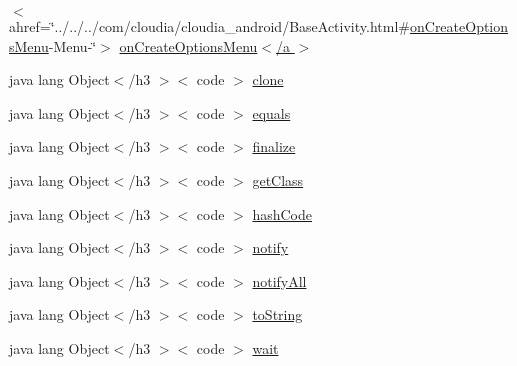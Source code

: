 \begin{DoxyCompactItemize}
$<$ ahref=\char`\"{}../../../com/cloudia/cloudia\-\_\-android/Base\-Activity.\-html\#\hyperlink{index-13_8html_a96b77eefe935dd33e8be2f1a26fcd2b6}{on\-Create\-Options\-Menu}-\/Menu-\/\char`\"{}$>$ \hyperlink{_splash_activity_8html_a624d351f7879c37d4dbd43acf019df6c}{on\-Create\-Options\-Menu$<$/a $>$}
\item 
java lang Object$<$/h3 $>$$<$ code $>$ \hyperlink{_splash_activity_8html_adc9607fcabf6f2d7f401ad52015ef6e0}{clone}
\item 
java lang Object$<$/h3 $>$$<$ code $>$ \hyperlink{_splash_activity_8html_a8974318cea585f72df717e0380ec7104}{equals}
\item 
java lang Object$<$/h3 $>$$<$ code $>$ \hyperlink{_splash_activity_8html_ab2315181ead4aeedef2374039b6ddde7}{finalize}
\item 
java lang Object$<$/h3 $>$$<$ code $>$ \hyperlink{_splash_activity_8html_a98e6644727fe65eac217a6855045be43}{get\-Class}
\item 
java lang Object$<$/h3 $>$$<$ code $>$ \hyperlink{_splash_activity_8html_a8e178e2bb2bef055ea23ea3910a221ca}{hash\-Code}
\item 
java lang Object$<$/h3 $>$$<$ code $>$ \hyperlink{_splash_activity_8html_ae99ae10b5010594dbda4794e02db271b}{notify}
\item 
java lang Object$<$/h3 $>$$<$ code $>$ \hyperlink{_splash_activity_8html_a1279357e6e09e33e75b55eb05fdb6436}{notify\-All}
\item 
java lang Object$<$/h3 $>$$<$ code $>$ \hyperlink{_splash_activity_8html_a36e8a76a4132c9a7081416f27d087615}{to\-String}
\item 
java lang Object$<$/h3 $>$$<$ code $>$ \hyperlink{_splash_activity_8html_a9a9f0c22e5688d478c707f910f1c1aea}{wait}
\end{DoxyCompactItemize}


